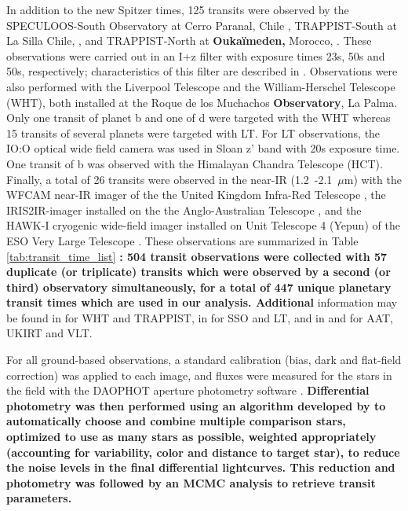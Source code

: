 \documentclass[twocolumn]{aastex63}
\begin{document}
In addition to the new Spitzer times, 125 transits were observed by the SPECULOOS-South Observatory  at Cerro Paranal, Chile \citetext{SSO; \citealt{Burdanov2018}, \citealt{Jehin2018}, \citealt{Gillon2018}, \citealt{Delrez2018b}}, TRAPPIST-South at La Silla Chile, \citep[TS;][]{Jehin2011,Gillon2011}, and TRAPPIST-North at \textbf{Ouka\"imeden,} Morocco, \citep[TN;][]{Barkaoui2019AJ}. These observations were carried out in an I+z filter with exposure times 23s, 50s and 50s, respectively; characteristics of this filter are described in \cite{Murray2020}.
Observations were also performed with the Liverpool Telescope  \citep[LT;][]{Steele2004} and the William-Herschel Telescope (WHT), both installed at the Roque de los Muchachos \textbf{Observatory}, La Palma. Only one transit of planet b and one of d were targeted with the WHT whereas 15 transits of several planets were targeted with LT. For LT observations, the IO:O optical wide field camera was used in Sloan z' band with 20s exposure time. One transit of b was observed with the  Himalayan Chandra Telescope (HCT). Finally, a total of 26 transits were observed in the near-IR (1.2~-2.1~$\mu$m) with the WFCAM near-IR imager of the the United Kingdom Infra-Red Telescope \citep[UKIRT;][]{Casali2007}, the IRIS2IR-imager installed on the the Anglo-Australian Telescope \citep[AAT;][]{Tinney2004}, and the HAWK-I cryogenic wide-field imager installed on Unit Telescope 4 (Yepun) of the ESO Very Large Telescope \citep[VLT;][]{Siebenmorgen2011}.
These observations are summarized in Table \ref{tab:transit_time_list} \textbf{: 504 transit observations were collected with 57 duplicate (or triplicate) transits which were observed by a second (or third) observatory simultaneously, for a total of 447 unique planetary transit times which are used in our analysis.  Additional} information may be found in \citet{Gillon2016} for WHT and TRAPPIST, in  \citet{Ducrot2018} for SSO and LT, and in \citet{Gillon2017} and \citet{Burdanov2019} for AAT, UKIRT and VLT.

For all ground-based observations, a standard calibration (bias, dark and flat-field correction) was applied to each image, and fluxes were measured for the stars in the field with the DAOPHOT aperture photometry software \citep{Stetson1987}. \textbf{Differential photometry was then performed using an algorithm developed by \cite{Murray2020} to automatically choose and combine multiple comparison stars, optimized to use as many stars as possible, weighted appropriately (accounting for variability, color and distance to target star), to reduce the noise levels in the final differential lightcurves. This reduction and photometry was followed by an MCMC analysis to retrieve transit parameters.}
\end{document}
